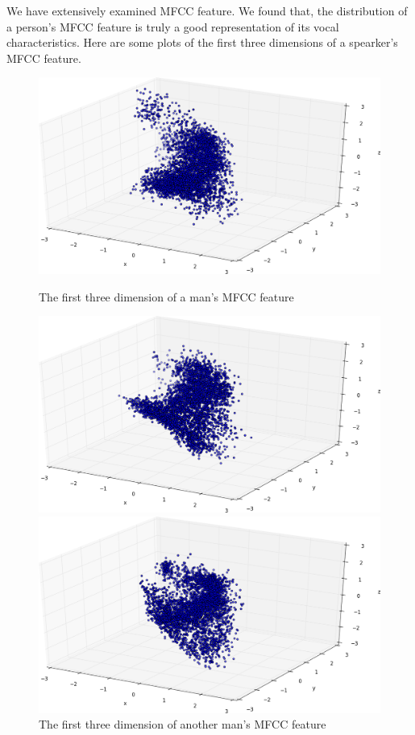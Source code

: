 \begin{enumerate}
			We have extensively examined MFCC feature. We found that, the
			distribution of a person's MFCC feature is truly a good representation
			of its vocal characteristics. Here are some plots of the first three
			dimensions of a spearker's MFCC feature.
			\begin{figure}[!ht]
				\begin{minipage}{0.48\linewidth}
					\centering
					\includegraphics[width=\linewidth]{res/m_002_03.trimed.png}
					\caption{The first three dimension of a man's MFCC feature}
				\end{minipage}
				\hfill
				\begin{minipage}{0.48\linewidth}
					\centering
					\includegraphics[width=\linewidth]{res/m_004_03.trimed.png}
					\caption{The first three dimension of another man's MFCC feature}
				\end{minipage}
				\vfill
				\begin{minipage}{0.48\linewidth}
					\centering
					\includegraphics[width=\linewidth]{res/f_001_03.trimed.png}

\end{minipage}
\end{figure}
\end{enumerate}
